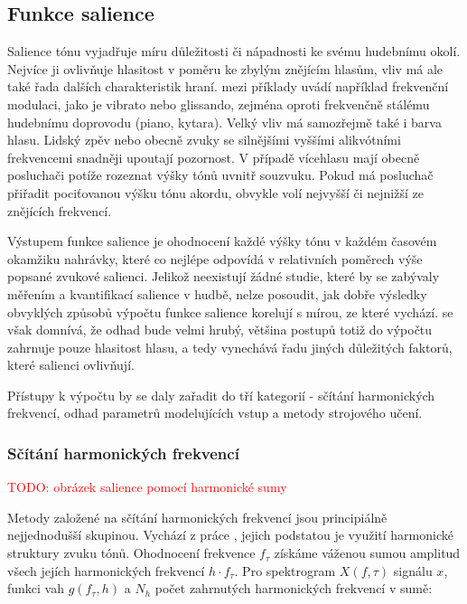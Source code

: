 \subsection{Funkce salience}

Salience tónu vyjadřuje míru důležitosti či nápadnosti ke svému hudebnímu okolí. Nejvíce ji ovlivňuje hlasitost v poměru ke zbylým znějícím hlasům, vliv má ale také řada dalších charakteristik hraní. \cite{Dressler2016} mezi příklady uvádí například frekvenční modulaci, jako je vibrato nebo glissando, zejména oproti frekvenčně stálému hudebnímu doprovodu (piano, kytara). Velký vliv má samozřejmě také i barva hlasu. Lidský zpěv nebo obecně zvuky se silnějšími vyššími alikvótními frekvencemi snadněji upoutají pozornost. V případě vícehlasu mají obecně posluchači potíže rozeznat výšky tónů uvnitř souzvuku. Pokud má posluchač přiřadit pociťovanou výšku tónu akordu, obvykle volí nejvyšší či nejnižší ze znějících frekvencí.

Výstupem funkce salience je ohodnocení každé výšky tónu v každém časovém okamžiku nahrávky, které co nejlépe odpovídá v relativních poměrech výše popsané zvukové salienci. Jelikož neexistují žádné studie, které by se zabývaly měřením a kvantifikací salience v hudbě, nelze posoudit, jak dobře výsledky obvyklých způsobů výpočtu funkce salience korelují s mírou, ze které vychází. \cite{Bittner2018a} se však domnívá, že odhad bude velmi hrubý, většina postupů totiž do výpočtu zahrnuje pouze hlasitost hlasu, a tedy vynechává řadu jiných důležitých faktorů, které salienci ovlivňují.

Přístupy k výpočtu by se daly zařadit do tří kategorií - sčítání harmonických frekvencí, odhad parametrů modelujících vstup a metody strojového učení. 

\subsubsection{Sčítání harmonických frekvencí}

\textcolor{red}{TODO: obrázek salience pomocí harmonické sumy}

Metody založené na sčítání harmonických frekvencí jsou principiálně nejjednodušší skupinou. Vychází z práce \cite{Hermes1988}, jejich podstatou je využití harmonické struktury zvuku tónů. Ohodnocení frekvence $f_\tau$ získáme váženou sumou amplitud všech jejích harmonických frekvencí $h \cdot f_\tau$. Pro spektrogram $X(f, \tau)$ signálu $x$, funkci vah $g(f_\tau, h)$ a $N_h$ počet zahrnutých harmonických frekvencí v sumě:

